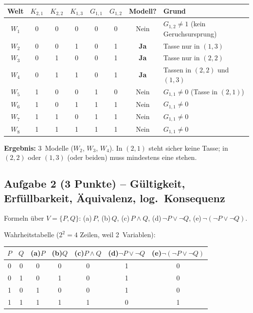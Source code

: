 \documentclass[a4paper,12pt]{article}
\begin{document}
\begin{center}
\renewcommand{\arraystretch}{1.2}
\begin{tabular}{c|ccc|cc|c|l}
\toprule
Welt & $K_{2,1}$ & $K_{2,2}$ & $K_{1,3}$
     & $G_{1,1}$ & $G_{1,2}$ & Modell? & Grund \\
\midrule
$W_1$ & 0 & 0 & 0 & 0 & 0 & Nein & $G_{1,2} \neq 1$ (kein Geruchsursprung) \\
$W_2$ & 0 & 0 & 1 & 0 & 1 & \textbf{Ja} & Tasse nur in $(1{,}3)$ \\
$W_3$ & 0 & 1 & 0 & 0 & 1 & \textbf{Ja} & Tasse nur in $(2{,}2)$ \\
$W_4$ & 0 & 1 & 1 & 0 & 1 & \textbf{Ja} & Tassen in $(2{,}2)$ und $(1{,}3)$ \\
$W_5$ & 1 & 0 & 0 & 1 & 0 & Nein & $G_{1,1} \neq 0$ (Tasse in $(2{,}1)$) \\
$W_6$ & 1 & 0 & 1 & 1 & 1 & Nein & $G_{1,1} \neq 0$ \\
$W_7$ & 1 & 1 & 0 & 1 & 1 & Nein & $G_{1,1} \neq 0$ \\
$W_8$ & 1 & 1 & 1 & 1 & 1 & Nein & $G_{1,1} \neq 0$ \\
\bottomrule
\end{tabular}
\end{center}

\textbf{Ergebnis:} 3~Modelle ($W_2$, $W_3$, $W_4$).
In $(2{,}1)$ steht sicher keine Tasse; in $(2{,}2)$ oder $(1{,}3)$
(oder beiden) muss mindestens eine stehen.

\newpage

\subsection*{Aufgabe 2 \textnormal{(3 Punkte)} -- G\"ultigkeit,
Erf\"ullbarkeit, \"Aquivalenz, log.\ Konsequenz}

Formeln \"uber $V = \{P, Q\}$:
\;(a)\,$P$,
\;(b)\,$Q$,
\;(c)\,$P \wedge Q$,
\;(d)\,$\neg P \vee \neg Q$,
\;(e)\,$\neg(\neg P \vee \neg Q)$.

\medskip
Wahrheitstabelle ($2^2 = 4$ Zeilen, weil 2~Variablen):

\begin{center}
\renewcommand{\arraystretch}{1.25}
\begin{tabular}{cc|ccccc}
\toprule
$P$ & $Q$
  & (a)\;$P$
  & (b)\;$Q$
  & (c)\;$P \wedge Q$
  & (d)\;$\neg P \vee \neg Q$
  & (e)\;$\neg(\neg P \vee \neg Q)$ \\
\midrule
0 & 0 & 0 & 0 & 0 & 1 & 0 \\
0 & 1 & 0 & 1 & 0 & 1 & 0 \\
1 & 0 & 1 & 0 & 0 & 1 & 0 \\
1 & 1 & 1 & 1 & 1 & 0 & 1 \\
\bottomrule
\end{tabular}
\end{center}
\end{document}
